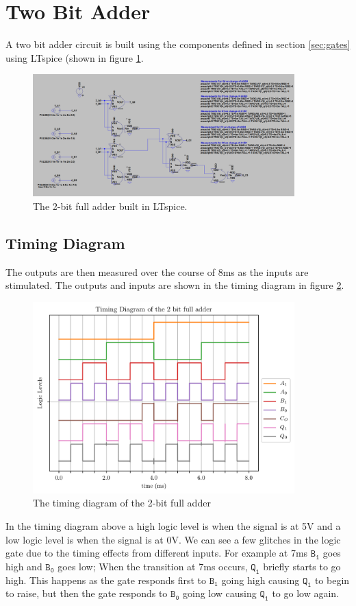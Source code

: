 \documentclass[12pt, titlepage]{article}
\newcommand\Ba{\ensuremath{\mathtt{B_0}}}
\newcommand\Bb{\ensuremath{\mathtt{B_1}}}
\newcommand\Qb{\ensuremath{\mathtt{Q_1}}}
\begin{document}
    \section{Two Bit Adder}
    A two bit adder circuit is built using the components defined in
    section \ref{sec:gates} using LTspice (shown in figure
    \ref{fig:adder}.
    \begin{figure}[H]
        \centering
        \includegraphics[width=0.9\textwidth]{figures/circuit.png}
        \caption{The 2-bit full adder built in LTspice.}
        \label{fig:adder}
    \end{figure}

    \subsection{Timing Diagram}
    The outputs are then measured over the course of 8ms as the inputs
    are stimulated. The outputs and inputs are shown in the timing
    diagram in figure \ref{fig:timing}.
    \begin{figure}[H]
        \centering
        \includegraphics[width=0.9\textwidth]{figures/timing.png}
        \caption{The timing diagram of the 2-bit full adder}
        \label{fig:timing}
    \end{figure}
    In the timing diagram above a high logic level is when the signal is
    at 5V and a low logic level is when the signal is at 0V. We can see
    a few glitches in the logic gate due to the timing effects from
    different inputs. For example at 7ms $\Bb$ goes high and $\Ba$ goes
    low; When the transition at 7ms occurs, $\Qb$ briefly starts to go
    high. This happens as the gate responds first to $\Bb$ going high
    causing $\Qb$ to begin to raise, but then the gate responds to $\Ba$
    going low causing $\Qb$ to go low again.\\
\end{document}
